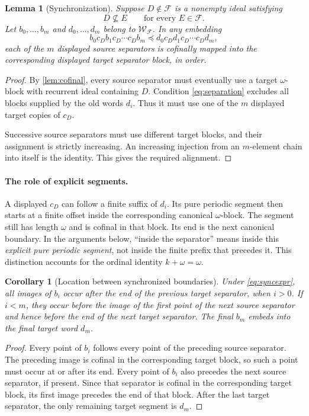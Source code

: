 \documentclass[11pt]{article}
\numberwithin{equation}{section}
\theoremstyle{plain}
\newtheorem{lemma}[lemma]{Lemma}
\newtheorem{corollary}[corollary]{Corollary}
\theoremstyle{definition}
\theoremstyle{remark}
\newcommand{\F}{\mathcal F}
\newcommand{\W}{\mathcal W}
\newcommand{\sub}{\preccurlyeq}
\begin{document}
\begin{lemma}[Synchronization]\label{lem:sync}
Suppose $D\notin\F$ is a nonempty ideal satisfying
\begin{equation}\label{eq:separation}
 D\nsubseteq E\qquad\text{for every }E\in\F.
\end{equation}
Let $b_0,\ldots,b_m$ and $d_0,\ldots,d_m$ belong to $\W_{\F}$. In any embedding
\begin{equation}\label{eq:syncexpr}
 b_0c_D b_1c_D\cdots c_D b_m
 \sub
 d_0c_D d_1c_D\cdots c_D d_m,
\end{equation}
each of the $m$ displayed source separators is cofinally mapped into the corresponding displayed target separator block, in order.
\end{lemma}
\begin{proof}
By \cref{lem:cofinal}, every source separator must eventually use a target $\omega$-block with recurrent ideal containing $D$. Condition \eqref{eq:separation} excludes all blocks supplied by the old words $d_i$. Thus it must use one of the $m$ displayed target copies of $c_D$.

Successive source separators must use different target blocks, and their assignment is strictly increasing. An increasing injection from an $m$-element chain into itself is the identity. This gives the required alignment.
\end{proof}

\paragraph{The role of explicit segments.}
A displayed $c_D$ can follow a finite suffix of $d_i$. Its pure periodic segment then starts at a finite offset inside the corresponding canonical $\omega$-block. The segment still has length $\omega$ and is cofinal in that block. Its end is the next canonical boundary. In the arguments below, ``inside the separator'' means inside this \emph{explicit pure periodic segment}, not inside the finite prefix that precedes it. This distinction accounts for the ordinal identity $k+\omega=\omega$.

\begin{corollary}[Location between synchronized boundaries]\label{cor:between}
Under \eqref{eq:syncexpr}, all images of $b_i$ occur after the end of the previous target separator, when $i>0$. If $i<m$, they occur before the image of the first point of the next source separator and hence before the end of the next target separator. The final $b_m$ embeds into the final target word $d_m$.
\end{corollary}
\begin{proof}
Every point of $b_i$ follows every point of the preceding source separator. The preceding image is cofinal in the corresponding target block, so such a point must occur at or after its end. Every point of $b_i$ also precedes the next source separator, if present. Since that separator is cofinal in the corresponding target block, its first image precedes the end of that block. After the last target separator, the only remaining target segment is $d_m$.
\end{proof}
\end{document}
